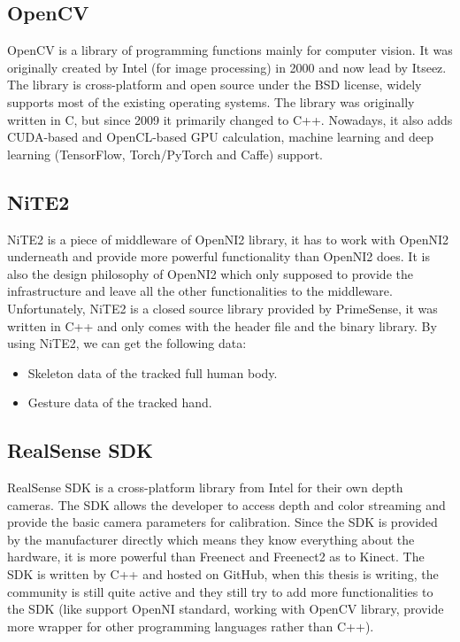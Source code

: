 \subsection{OpenCV}

OpenCV is a library of programming functions mainly for computer vision. It
was originally created by Intel (for image processing) in 2000 and now lead by
Itseez. The library is cross-platform and open source under the BSD license,
widely supports most of the existing operating systems. The library was 
originally written in C, but since 2009 it primarily changed to C++. Nowadays, 
it also adds CUDA-based and OpenCL-based GPU calculation, machine learning and
deep learning (TensorFlow, Torch/PyTorch and Caffe) support.

\subsection{NiTE2}
\label{sec:related_work_openiss_nite2}

NiTE2 is a piece of middleware of OpenNI2 library, it has to work with OpenNI2
underneath and provide more powerful functionality than OpenNI2 does. It is
also the design philosophy of OpenNI2 which only supposed to provide the
infrastructure and leave all the other functionalities to the middleware.
Unfortunately, NiTE2 is a closed source library provided by PrimeSense, it was
written in C++ and only comes with the header file and the binary library. By
using NiTE2, we can get the following data:

\begin{itemize}
    \item Skeleton data of the tracked full human body.
    \item Gesture data of the tracked hand.
\end{itemize}

\subsection{RealSense SDK}

RealSense SDK is a cross-platform library from Intel for their own depth
cameras. The SDK allows the developer to access depth and color streaming and
provide the basic camera parameters for calibration. Since the SDK is provided
by the manufacturer directly which means they know everything about the
hardware, it is more powerful than Freenect and Freenect2 as to Kinect. The SDK
is written by C++ and hosted on GitHub, when this thesis is writing, the
community is still quite active and they still try to add more functionalities
to the SDK (like support OpenNI standard, working with OpenCV library, provide
more wrapper for other programming languages rather than C++).

